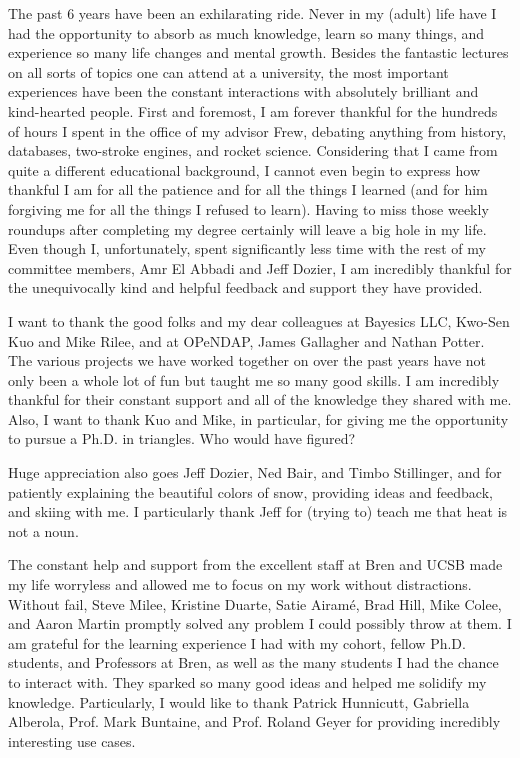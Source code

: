 \begin{acknowledgements}
The past 6 years have been an exhilarating ride. Never in my (adult) life have I had the opportunity to absorb as much knowledge, learn so many things, and experience so many life changes and mental growth.
Besides the fantastic lectures on all sorts of topics one can attend at a university, the most important experiences have been the constant interactions with absolutely brilliant and kind-hearted people. First and foremost, I am forever thankful for the hundreds of hours I spent in the office of my advisor Frew, debating anything from history, databases, two-stroke engines, and rocket science. Considering that I came from quite a different educational background, I cannot even begin to express how thankful I am for all the patience and for all the things I learned (and for him forgiving me for all the things I refused to learn). Having to miss those weekly roundups after completing my degree certainly will leave a big hole in my life. Even though I, unfortunately, spent significantly less time with the rest of my committee members, Amr El Abbadi and Jeff Dozier, I am incredibly thankful for the unequivocally kind and helpful feedback and support they have provided.

I want to thank the good folks and my dear colleagues at Bayesics LLC, Kwo-Sen Kuo and Mike Rilee, and at OPeNDAP, James Gallagher and Nathan Potter. The various projects we have worked together on over the past years have not only been a whole lot of fun but taught me so many good skills. I am incredibly thankful for their constant support and all of the knowledge they shared with me. Also, I want to thank Kuo and Mike, in particular, for giving me the opportunity to pursue a Ph.D. in triangles. Who would have figured?

Huge appreciation also goes Jeff Dozier, Ned Bair, and Timbo Stillinger, and for patiently explaining the beautiful colors of snow, providing ideas and feedback, and skiing with me. I particularly thank Jeff for (trying to) teach me that heat is not a noun.

The constant help and support from the excellent staff at Bren and UCSB made my life worryless and allowed me to focus on my work without distractions. Without fail, Steve Milee, Kristine Duarte, Satie Airamé, Brad Hill, Mike Colee, and Aaron Martin promptly solved any problem I could possibly throw at them. I am grateful for the learning experience I had with my cohort, fellow Ph.D. students, and Professors at Bren, as well as the many students I had the chance to interact with. They sparked so many good ideas and helped me solidify my knowledge. Particularly, I would like to thank Patrick Hunnicutt, Gabriella Alberola, Prof. Mark Buntaine, and Prof. Roland Geyer for providing incredibly interesting use cases.


\end{acknowledgements}
